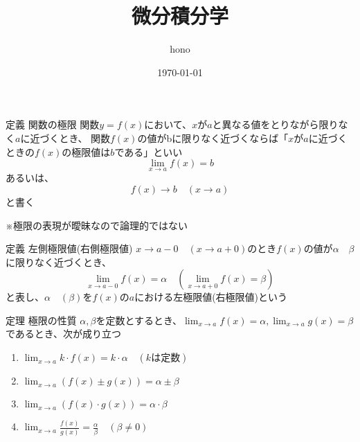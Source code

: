 \documentclass[a4paper]{jarticle}
\title{\Huge 微分積分学}%
\date{\today}%
\author{\quad hono}%
\begin{document}
    \maketitle
    \newpage
    \tableofcontents
    \newpage


%    
    \begin{itembox}[l]{定義 関数の極限}
        関数$y=f(x)$において、$x$が$a$と異なる値をとりながら限りなく$a$に近づくとき、
        関数$f(x)$の値がbに限りなく近づくならば「$x$が$a$に近づくときの$f(x)$の極限値は$b$である」といい
        \begin{equation}
            \lim_{x \to a} f(x) = b
        \end{equation}
        あるいは、
        \begin{equation}
            f(x) \to b \quad (x \to a)
        \end{equation}
        と書く
    \end{itembox}
    ※極限の表現が曖昧なので論理的ではない

    \begin{itembox}[l]{定義 左側極限値(右側極限値)}
        $x \to a-0 \quad (x \to a + 0)$のとき$f(x)$の値が$\alpha \quad \beta$に限りなく近づくとき、
        \begin{equation}
            \lim_{x \to a-0} f(x) = \alpha \quad (\lim_{x \to a+0} f(x) = \beta)
        \end{equation}
        と表し、$\alpha \quad (\beta)$を$f(x)$の$a$における左極限値(右極限値)という
    \end{itembox}

    \begin{itembox}[l]{定理 極限の性質}
        $\alpha, \beta$を定数とするとき、$\lim_{x \to a} f(x) = \alpha, \lim_{x \to a} g(x) = \beta$であるとき、次が成り立つ
        \begin{enumerate}
            \item $\lim_{x \to a} k \cdot f(x) = k \cdot \alpha \quad (kは定数)$
            \item $\lim_{x \to a} (f(x) \pm g(x)) = \alpha \pm \beta$
            \item $\lim_{x \to a} (f(x) \cdot g(x)) = \alpha \cdot \beta$
            \item $\lim_{x \to a} \frac{f(x)}{g(x)} = \frac{\alpha}{\beta} \quad (\beta \neq 0)$
        \end{enumerate}
    \end{itembox}
\end{document}
